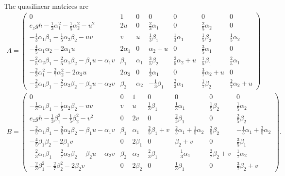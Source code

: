   The quasilinear matrices are
  \begin{gather}
    A =
    \begin{pmatrix}
      0 & 1 & 0 & 0 & 0 & 0 & 0 \\
      e_{z} g h - \frac{1}{3} \alpha_{1}^{2} - \frac{1}{5} \alpha_{2}^{2} - u^{2} & 2 u & 0 & \frac{2}{3} \alpha_{1} & 0 & \frac{2}{5} \alpha_{2} & 0 \\
      -\frac{1}{3} \alpha_{1} \beta_{1} - \frac{1}{5} \alpha_{2} \beta_{2} - u v & v & u & \frac{1}{3} \beta_{1} & \frac{1}{3} \alpha_{1} & \frac{1}{5} \beta_{2} & \frac{1}{5} \alpha_{2} \\
      -\frac{4}{5} \alpha_{1} \alpha_{2} - 2 \alpha_{1} u & 2 \alpha_{1} & 0 & \alpha_{2} + u & 0 & \frac{3}{5} \alpha_{1} & 0 \\
      -\frac{2}{5} \alpha_{2} \beta_{1} - \frac{2}{5} \alpha_{1} \beta_{2} - \beta_{1} u - \alpha_{1} v & \beta_{1} & \alpha_{1} & \frac{3}{5} \beta_{2} & \frac{2}{5} \alpha_{2} + u & \frac{1}{5} \beta_{1} & \frac{2}{5} \alpha_{1} \\
      -\frac{2}{3} \alpha_{1}^{2} - \frac{2}{7} \alpha_{2}^{2} - 2 \alpha_{2} u & 2 \alpha_{2} & 0 & \frac{1}{3} \alpha_{1} & 0 & \frac{3}{7} \alpha_{2} + u & 0 \\
      -\frac{2}{3} \alpha_{1} \beta_{1} - \frac{2}{7} \alpha_{2} \beta_{2} - \beta_{2} u - \alpha_{2} v & \beta_{2} & \alpha_{2} & -\frac{1}{3} \beta_{1} & \frac{2}{3} \alpha_{1} & \frac{1}{7} \beta_{2} & \frac{2}{7} \alpha_{2} + u
    \end{pmatrix} \\
    B =
    \begin{pmatrix}
      0 & 0 & 1 & 0 & 0 & 0 & 0 \\
      -\frac{1}{3} \alpha_{1} \beta_{1} - \frac{1}{5} \alpha_{2} \beta_{2} - u v & v & u & \frac{1}{3} \beta_{1} & \frac{1}{3} \alpha_{1} & \frac{1}{5} \beta_{2} & \frac{1}{5} \alpha_{2} \\
      e_{z} g h - \frac{1}{3} \beta_{1}^{2} - \frac{1}{5} \beta_{2}^{2} - v^{2} & 0 & 2 v & 0 & \frac{2}{3} \beta_{1} & 0 & \frac{2}{5} \beta_{2} \\
      -\frac{2}{5} \alpha_{1} \beta_{1} - \frac{2}{5} \alpha_{2} \beta_{2} - \beta_{1} u - \alpha_{1} v & \beta_{1} & \alpha_{1} & \frac{2}{5} \beta_{1} + v & \frac{2}{5} \alpha_{1} + \frac{1}{5} \alpha_{2} & \frac{2}{5} \beta_{2} & -\frac{1}{5} \alpha_{1} + \frac{2}{5} \alpha_{2} \\
      -\frac{4}{5} \beta_{1} \beta_{2} - 2 \beta_{1} v & 0 & 2 \beta_{1} & 0 & \beta_{2} + v & 0 & \frac{3}{5} \beta_{1} \\
      -\frac{2}{3} \alpha_{1} \beta_{1} - \frac{2}{7} \alpha_{2} \beta_{2} - \beta_{2} u - \alpha_{2} v & \beta_{2} & \alpha_{2} & \frac{2}{3} \beta_{1} & -\frac{1}{3} \alpha_{1} & \frac{2}{7} \beta_{2} + v & \frac{1}{7} \alpha_{2} \\
      -\frac{2}{3} \beta_{1}^{2} - \frac{2}{7} \beta_{2}^{2} - 2 \beta_{2} v & 0 & 2 \beta_{2} & 0 & \frac{1}{3} \beta_{1} & 0 & \frac{3}{7} \beta_{2} + v
    \end{pmatrix}.
  \end{gather}
